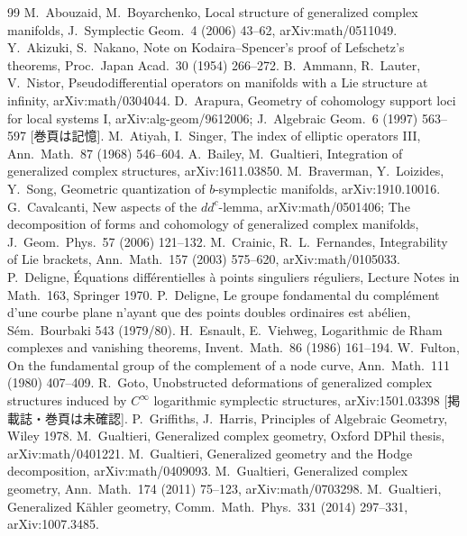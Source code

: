 \begin{thebibliography}{99}\small
{} M.\ Abouzaid, M.\ Boyarchenko, Local structure of generalized complex manifolds, J.\ Symplectic Geom.\ 4 (2006) 43--62, arXiv:math/0511049.
 Y.\ Akizuki, S.\ Nakano, Note on Kodaira--Spencer's proof of Lefschetz's theorems, Proc.\ Japan Acad.\ 30 (1954) 266--272.
 B.\ Ammann, R.\ Lauter, V.\ Nistor, Pseudodifferential operators on manifolds with a Lie structure at infinity, arXiv:math/0304044.
 D.\ Arapura, Geometry of cohomology support loci for local systems I, arXiv:alg-geom/9612006; J.\ Algebraic Geom.\ 6 (1997) 563--597 [巻頁は記憶\tQ].
 M.\ Atiyah, I.\ Singer, The index of elliptic operators III, Ann.\ Math.\ 87 (1968) 546--604.
 A.\ Bailey, M.\ Gualtieri, Integration of generalized complex structures, arXiv:1611.03850.
 M.\ Braverman, Y.\ Loizides, Y.\ Song, Geometric quantization of $b$-symplectic manifolds, arXiv:1910.10016.
 G.\ Cavalcanti, New aspects of the $dd^c$-lemma, arXiv:math/0501406; The decomposition of forms and cohomology of generalized complex manifolds, J.\ Geom.\ Phys.\ 57 (2006) 121--132.
 M.\ Crainic, R.\ L.\ Fernandes, Integrability of Lie brackets, Ann.\ Math.\ 157 (2003) 575--620, arXiv:math/0105033.
 P.\ Deligne, \'Equations diff\'erentielles \`a points singuliers r\'eguliers, Lecture Notes in Math.\ 163, Springer 1970.
 P.\ Deligne, Le groupe fondamental du compl\'ement d'une courbe plane n'ayant que des points doubles ordinaires est ab\'elien, S\'em.\ Bourbaki 543 (1979/80).
 H.\ Esnault, E.\ Viehweg, Logarithmic de Rham complexes and vanishing theorems, Invent.\ Math.\ 86 (1986) 161--194.
 W.\ Fulton, On the fundamental group of the complement of a node curve, Ann.\ Math.\ 111 (1980) 407--409.
 R.\ Goto, Unobstructed deformations of generalized complex structures induced by $C^\infty$ logarithmic symplectic structures, arXiv:1501.03398 [掲載誌・巻頁は未確認\tQ].
 P.\ Griffiths, J.\ Harris, Principles of Algebraic Geometry, Wiley 1978.
 M.\ Gualtieri, Generalized complex geometry, Oxford DPhil thesis, arXiv:math/0401221.
 M.\ Gualtieri, Generalized geometry and the Hodge decomposition, arXiv:math/0409093.
 M.\ Gualtieri, Generalized complex geometry, Ann.\ Math.\ 174 (2011) 75--123, arXiv:math/0703298.
 M.\ Gualtieri, Generalized K\"ahler geometry, Comm.\ Math.\ Phys.\ 331 (2014) 297--331, arXiv:1007.3485.

\end{thebibliography}
